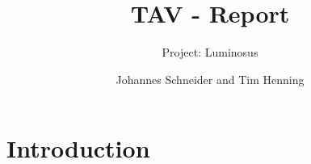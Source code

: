 \documentclass{scrartcl}
\title{TAV - Report}
\subtitle{Project: Luminosus}
\author{Johannes Schneider and Tim Henning}
\begin{document}
\maketitle

\section{Introduction}

\subsection{}
\end{document}
